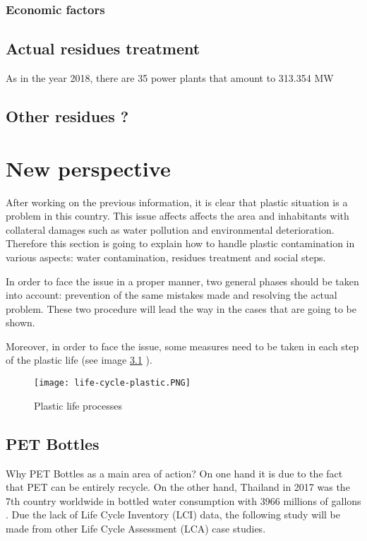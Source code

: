 \documentclass[twoside,a4paper,12pt]{report}
\begin{document}
\subsection{Economic factors}
\section{Actual residues treatment}
As in the year 2018, there are 35 power plants that amount to 313.354 MW
\section{Other residues ?}

\chapter{New perspective}
After working on the previous information, it is clear that plastic situation is a problem in this country. This issue affects affects the area and inhabitants with collateral damages such as water pollution and environmental deterioration. Therefore this section is going to explain how to handle plastic contamination in various aspects: water contamination, residues treatment and social steps.

In order to face the issue in a proper manner, two general phases should be taken into account: prevention of the same mistakes made and resolving the actual problem. These two procedure will lead the way in the cases that are going to be shown.

Moreover, in order to face the issue, some measures need to be taken in each step of the  plastic life (see image \ref{plalifepros} ). 


\begin{figure}
    \centering
    \texttt{[image: life-cycle-plastic.PNG]}
    \caption{Plastic life processes}
     \label{plalifepros} 
\end{figure}

\section{PET Bottles}
Why PET Bottles as a main area of action? On one hand it is due to the fact that PET can be entirely recycle. On the other hand, Thailand in 2017 was the 7th country worldwide in bottled water consumption with 3966 millions of gallons \cite{Bwr17}. 
Due the lack of Life Cycle Inventory (LCI) data, the following study will be made from other Life Cycle Assessment (LCA) case studies.
\end{document}
